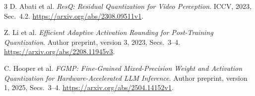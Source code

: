\documentclass[10pt,a4paper]{article}
\begin{document}
\begin{thebibliography}{3}
D. Abati et al.
\emph{ResQ: Residual Quantization for Video Perception}.
ICCV, 2023, Sec.~4.2.
\url{https://arxiv.org/abs/2308.09511v1}.

Z. Li et al.
\emph{Efficient Adaptive Activation Rounding for Post-Training Quantization}.
Author preprint, version 3, 2023, Secs.~3--4.
\url{https://arxiv.org/abs/2208.11945v3}.

C. Hooper et al.
\emph{FGMP: Fine-Grained Mixed-Precision Weight and Activation Quantization
for Hardware-Accelerated LLM Inference}.
Author preprint, version 1, 2025, Secs.~3--4.
\url{https://arxiv.org/abs/2504.14152v1}.
\end{thebibliography}
\end{document}
